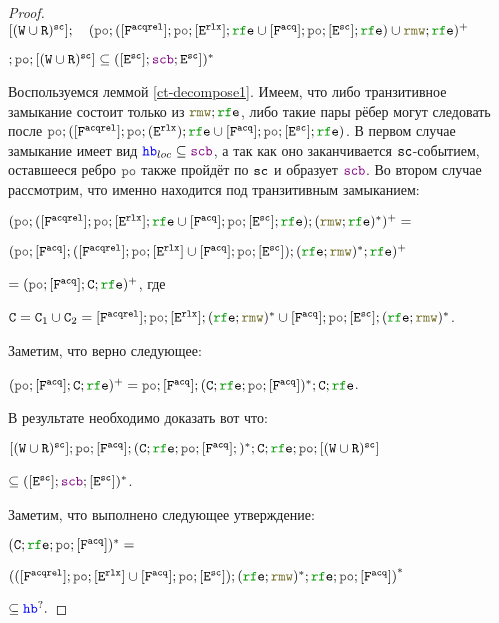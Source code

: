 \begin{proof}
  $[(\lW \cup \lR)^{\sco}] ; \quad (\lPO ; ([\Far] ; \lPO ; [\lE^{\rlx}] ; \lRFE \cup [\Fa] ; \lPO ; [\lE^{\sco}] ; \lRFE) \cup \lRMW ; \lRFE)^{+}$
  
  $; \lPO ; [(\lW \cup \lR)^{\sco}] \subseteq  ([\lE^{\sco}] ; \lSCB ;\lE^{\sco}])^{*}$

  Воспользуемся леммой \ref{ct-decompose1}. Имеем, что либо транзитивное замыкание состоит только из $\lRMW ; \lRFE$, либо такие пары рёбер могут следовать после $\lPO ; ([\Far] ; \lPO ; (\lE^{\rlx}) ; \lRFE \cup [\Fa] ; \lPO ; [\lE^{\sco}] ; \lRFE)$. В первом случае замыкание имеет вид $\lHB_{loc} \subseteq \lSCB$, а так как оно заканчивается ${\mathtt{sc}}$-событием, оставшееся ребро $\lPO$ также пройдёт по ${\mathtt{sc}}$ и образует $\lSCB$. Во втором случае рассмотрим, что именно находится под транзитивным замыканием:

  \newcommand{\CA}{\mathtt{C}}

  \noindent $(\lPO ; ([\Far] ; \lPO ; [\lE^{\rlx}] ; \lRFE \cup [\Fa] ; \lPO ; [\lE^{\sco}] ; \lRFE) ; (\lRMW ; \lRFE)^{*})^{+}=$

  \noindent $(\lPO ; [\Fa] ;([\Far] ; \lPO ; [\lE^{\rlx}] \cup [\Fa] ; \lPO ; [\lE^{\sco}]) ; (\lRFE ; \lRMW)^{*}; \lRFE)^{+}$

  \noindent $=(\lPO ; [\Fa]; \CA; \lRFE)^{+}$, где 

  $\CA=\CA_1 \cup \CA_2 = [\Far] ; \lPO ; [\lE^{\rlx}] ; (\lRFE ; \lRMW)^{*} \cup [\Fa] ; \lPO ; [\lE^{\sco}] ; (\lRFE ; \lRMW)^{*}$.

  \newcommand{\canceloffset}{\hspace{-0.78cm}}
  \canceloffset Заметим, что верно следующее: 
  
  $(\lPO ; [\Fa]; \CA; \lRFE)^{+}=\lPO ; [\Fa]; (\CA; \lRFE; \lPO ; [\Fa])^{*}; \CA; \lRFE$.

  \canceloffset В результате необходимо доказать вот что: 

  $[(\lW \cup \lR)^{\sco}] ; \lPO ; [\Fa]; (\CA; \lRFE; \lPO ; [\Fa];)^{*}; \CA; \lRFE; \lPO ; [(\lW \cup \lR)^{\sco}] $

  $\subseteq  ([\lE^{\sco}] ; \lSCB ; [\lE^{\sco}])^{*}$. 

  \canceloffset Заметим, что выполнено следующее утверждение:

  \noindent $(\CA; \lRFE; \lPO ; [\Fa])^{*} = $

  \noindent $\left(([\Far] ; \lPO ; [\lE^{\rlx}] \cup [\Fa] ; \lPO ; [\lE^{\sco}]) ; (\lRFE ; \lRMW)^{*}; \lRFE; \lPO ; [\Fa] \right)^{*} $

  \noindent $\subseteq \lHB^?.$
  

\end{proof}
